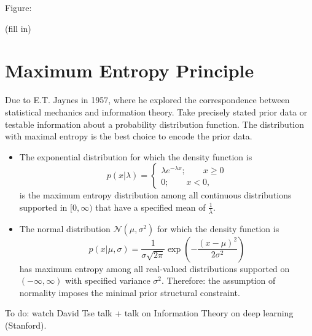   Figure:

  (fill in)



  \section{Maximum Entropy Principle}

  Due to E.T. Jaynes in 1957, where he explored the correspondence between statistical mechanics and information theory.  Take precisely stated prior data or testable information about a probability distribution function.  The distribution with maximal entropy is the best choice to encode the prior data.

  \begin{itemize}
    \item The exponential distribution for which the density function is
      \[
        p(x | \lambda) = 
        \begin{cases}
          \lambda e^{- \lambda x}; \qquad x \geq 0 \\
          0; \qquad x < 0,
        \end{cases}
      \]
      is the maximum entropy distribution among all continuous distributions supported in $[0, \infty)$ that have a specified mean of $\frac{1}{\lambda}$.
    \item The normal distribution $\mathcal{N}(\mu, \sigma^2)$ for which the density function is
      \[
        p(x | \mu, \sigma) = \frac{1}{\sigma \sqrt{2 \pi}} \exp \left( - \frac{(x-\mu)^2}{2 \sigma^2} \right)
      \]
      has maximum entropy among all real-valued distributions supported on $(-\infty, \infty)$ with specified variance $\sigma^2$.  Therefore: the assumption of normality imposes the minimal prior structural constraint. 

    \end{itemize}


    To do: watch David Tse talk + talk on Information Theory on deep learning (Stanford).


